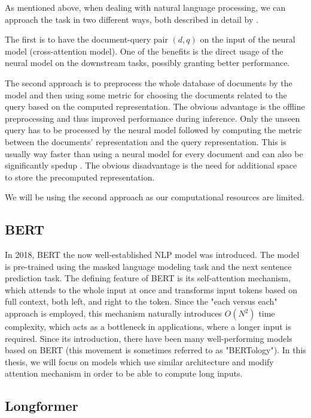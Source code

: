 As mentioned above, when dealing with natural language processing, we can approach the task in two different ways, both described in detail by \cite{two-tower}. 

The first is to have the document-query pair $(d,q)$ on the input of the neural model (cross-attention model).
One of the benefits is the direct usage of the neural model on the downstream tasks, possibly granting better performance.

The second approach is to preprocess the whole database of documents by the model and then using some metric for choosing the documents related to the query based on the computed representation.
The obvious advantage is the offline preprocessing and thus improved performance during inference.
Only the unseen query has to be processed by the neural model followed by computing the metric between the documents' representation and the query representation.
This is usually way faster than using a neural model for every document and can also be significantly spedup \citep{faiss}.
The obvious disadvantage is the need for additional space to store the precomputed representation.

We will be using the second approach as our computational resources are limited.

\subsection{BERT}
In 2018, BERT \citep{bert} the now well-established NLP model was introduced. The model is pre-trained using the masked language modeling task and the next sentence prediction task.
The defining feature of BERT is its self-attention mechanism, which attends to the whole input at once and transforms input tokens based on full context, both left, and right to the token.
Since the "each versus each" approach is employed, this mechanism naturally introduces $O(N^2)$ time complexity, which acts as a bottleneck in applications, where a longer input is required.
Since its introduction, there have been many well-performing models based on BERT (this movement is sometimes referred to as "BERTology").
In this thesis, we will focus on models which use similar architecture and modify attention mechanism in order to be able to compute long inputs.

\subsection{Longformer}

